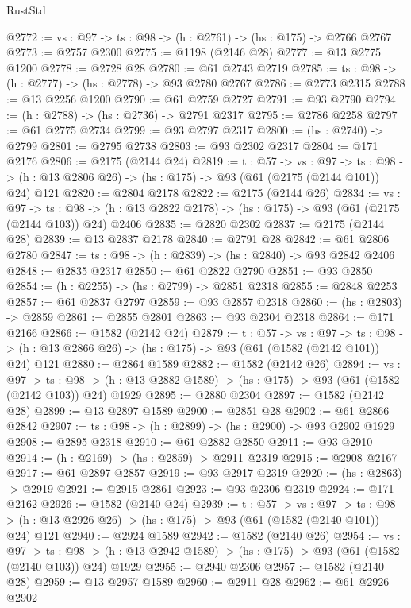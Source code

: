 \begin{lexlean}{RustStd}
\begin{coremodule}
@2772 := {vs : @97} -> {ts : @98} -> (h : @2761) -> (hs : @175) -> @2766 @2767
@2773 := @2757 @2300
@2775 := @1198 (@2146 @28)
@2777 := @13 @2775 @1200
@2778 := @2728 @28
@2780 := @61 @2743 @2719
@2785 := {ts : @98} -> (h : @2777) -> (hs : @2778) -> @93 @2780 @2767
@2786 := @2773 @2315
@2788 := @13 @2256 @1200
@2790 := @61 @2759 @2727
@2791 := @93 @2790
@2794 := (h : @2788) -> (hs : @2736) -> @2791 @2317
@2795 := @2786 @2258
@2797 := @61 @2775 @2734
@2799 := @93 @2797 @2317
@2800 := (hs : @2740) -> @2799
@2801 := @2795 @2738
@2803 := @93 @2302 @2317
@2804 := @171 @2176
@2806 := @2175 (@2144 @24)
@2819 := {t : @57} ->
  {vs : @97} ->
  {ts : @98} -> (h : @13 @2806 @26) -> (hs : @175) -> @93 (@61 (@2175 (@2144 @101)) @24) @121
@2820 := @2804 @2178
@2822 := @2175 (@2144 @26)
@2834 := {vs : @97} ->
  {ts : @98} -> (h : @13 @2822 @2178) -> (hs : @175) -> @93 (@61 (@2175 (@2144 @103)) @24) @2406
@2835 := @2820 @2302
@2837 := @2175 (@2144 @28)
@2839 := @13 @2837 @2178
@2840 := @2791 @28
@2842 := @61 @2806 @2780
@2847 := {ts : @98} -> (h : @2839) -> (hs : @2840) -> @93 @2842 @2406
@2848 := @2835 @2317
@2850 := @61 @2822 @2790
@2851 := @93 @2850
@2854 := (h : @2255) -> (hs : @2799) -> @2851 @2318
@2855 := @2848 @2253
@2857 := @61 @2837 @2797
@2859 := @93 @2857 @2318
@2860 := (hs : @2803) -> @2859
@2861 := @2855 @2801
@2863 := @93 @2304 @2318
@2864 := @171 @2166
@2866 := @1582 (@2142 @24)
@2879 := {t : @57} ->
  {vs : @97} ->
  {ts : @98} -> (h : @13 @2866 @26) -> (hs : @175) -> @93 (@61 (@1582 (@2142 @101)) @24) @121
@2880 := @2864 @1589
@2882 := @1582 (@2142 @26)
@2894 := {vs : @97} ->
  {ts : @98} -> (h : @13 @2882 @1589) -> (hs : @175) -> @93 (@61 (@1582 (@2142 @103)) @24) @1929
@2895 := @2880 @2304
@2897 := @1582 (@2142 @28)
@2899 := @13 @2897 @1589
@2900 := @2851 @28
@2902 := @61 @2866 @2842
@2907 := {ts : @98} -> (h : @2899) -> (hs : @2900) -> @93 @2902 @1929
@2908 := @2895 @2318
@2910 := @61 @2882 @2850
@2911 := @93 @2910
@2914 := (h : @2169) -> (hs : @2859) -> @2911 @2319
@2915 := @2908 @2167
@2917 := @61 @2897 @2857
@2919 := @93 @2917 @2319
@2920 := (hs : @2863) -> @2919
@2921 := @2915 @2861
@2923 := @93 @2306 @2319
@2924 := @171 @2162
@2926 := @1582 (@2140 @24)
@2939 := {t : @57} ->
  {vs : @97} ->
  {ts : @98} -> (h : @13 @2926 @26) -> (hs : @175) -> @93 (@61 (@1582 (@2140 @101)) @24) @121
@2940 := @2924 @1589
@2942 := @1582 (@2140 @26)
@2954 := {vs : @97} ->
  {ts : @98} -> (h : @13 @2942 @1589) -> (hs : @175) -> @93 (@61 (@1582 (@2140 @103)) @24) @1929
@2955 := @2940 @2306
@2957 := @1582 (@2140 @28)
@2959 := @13 @2957 @1589
@2960 := @2911 @28
@2962 := @61 @2926 @2902

\end{coremodule}
\end{lexlean}
